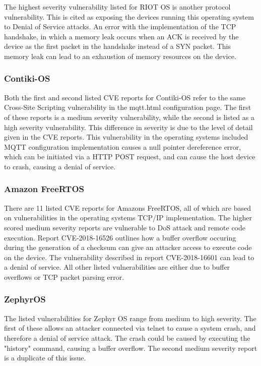The highest severity vulnerability listed for RIOT OS is another protocol
vulnerability. This is cited as exposing the devices running this operating
system to Denial of Service attacks. An error with the implementation of the TCP
handshake, in which a memory leak occurs when an ACK is received by the device
as the first packet in the handshake instead of a SYN packet\cite{riotCve3}. This memory leak
can lead to an exhaustion of memory resources on the device.

\subsubsection{\textbf{Contiki-OS}}

Both the first and second listed CVE reports for Contiki-OS refer to the same
Cross-Site Scripting vulnerability in the mqtt.html configuration page. The
first of these reports is a medium severity vulnerability\cite{contikiCve1},
while the second is listed as a high severity vulnerability\cite{contikiCve2}.
This difference in severity is due to the level of detail given in the CVE
reports. This vulnerability in the operating systems included MQTT configuration
implementation causes a null pointer dereference error, which can be initiated
via a HTTP POST request, and can cause the host device to crash, causing a denial of
service\cite{contikiMqtt}.

\subsubsection{\textbf{Amazon FreeRTOS}}

There are 11 listed CVE reports for Amazons FreeRTOS\cite{awsCve}, all of which are based on
vulnerabilities in the operating systems TCP/IP implementation. The higher
scored medium severity reports are vulnerable to DoS attack and remote code
execution. Report CVE-2018-16526\cite{awsCve1} outlines how a buffer overflow occuring during
the generation of a checksum can give an attacker access to execute code on the
device. The vulnerability described in report CVE-2018-16601\cite{awsCve2} can
lead to a denial of service. All other listed vulnerabilities are either due to
buffer overflows or TCP packet parsing error.

\subsubsection{\textbf{ZephyrOS}}

The listed vulnerabilities for Zephyr OS range from medium to high
severity\cite{zepCve}. The first of these allows an attacker connected via
telnet to cause a system crash, and therefore a denial of service attack. The
crash could be caused by executing the "history" command, causing a buffer
overflow\cite{zepCve1}. The second medium severity report is a duplicate of this
issue.

